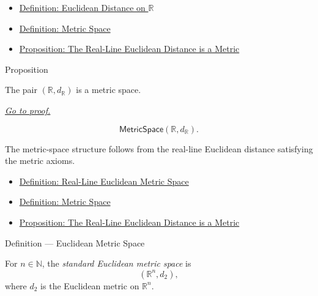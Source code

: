\begin{dependencies}
\begin{itemize}
  \item \hyperref[def:real-line-euclidean-distance]{Definition: Euclidean Distance on \(\mathbb{R}\)}
  \item \hyperref[def:metric-space]{Definition: Metric Space}
  \item \hyperref[prop:real-line-euclidean-distance-metric]{Proposition: The Real-Line Euclidean Distance is a Metric}
\end{itemize}
\end{dependencies}

\begin{propositionbox}{Proposition}
\begin{proposition}
\label{prop:real-line-euclidean-metric-space}
The pair \((\mathbb{R},d_{\mathbb{R}})\) is a metric space.

\smallskip
\noindent
\hyperref[prf:real-line-euclidean-metric-space]{\textit{Go to proof.}}
\end{proposition}
\end{propositionbox}

\begin{remark*}
\[
  \mathsf{MetricSpace}(\mathbb{R},d_{\mathbb{R}}).
\]
\end{remark*}

\begin{remark*}[Interpretation]
The metric-space structure follows from the real-line Euclidean distance satisfying the metric axioms.
\end{remark*}

\begin{dependencies}
\begin{itemize}
  \item \hyperref[def:real-line-euclidean-metric-space]{Definition: Real-Line Euclidean Metric Space}
  \item \hyperref[def:metric-space]{Definition: Metric Space}
  \item \hyperref[prop:real-line-euclidean-distance-metric]{Proposition: The Real-Line Euclidean Distance is a Metric}
\end{itemize}
\end{dependencies}

\begin{definitionbox}{Definition --- Euclidean Metric Space}
\begin{definition}\label{def:euclidean-metric-space}
For \(n\in\mathbb{N}\), the \emph{standard Euclidean metric space} is
\[
  (\mathbb{R}^n,d_2),
\]
where \(d_2\) is the Euclidean metric on \(\mathbb{R}^n\).
\end{definition}
\end{definitionbox}


